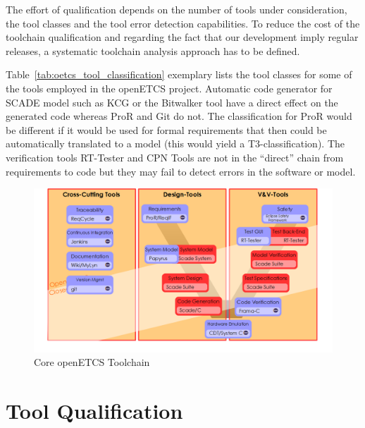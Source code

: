 \documentclass{template/openetcs_report}
\begin{document}
The effort of qualification depends on the number of tools under
consideration, the tool classes and the tool error detection
capabilities. To reduce the cost of the toolchain qualification and
regarding the fact that our development imply regular releases, a
systematic toolchain analysis approach has to be defined.

Table~\ref{tab:oetcs_tool_classification} exemplary lists the tool
classes for some of the tools employed in the openETCS
project. Automatic code generator for SCADE model such as KCG or the
Bitwalker tool have a direct effect on the generated code whereas ProR
and Git do not. The classification for ProR would be different if it
would be used for formal requirements that then could be automatically
translated to a model (this would yield a T3-classification). The
verification tools RT-Tester and CPN Tools are not in the ``direct''
chain from requirements to code but they may fail to detect errors in
the software or model.

\begin{figure}[h]
\centering
\includegraphics[width=0.9\linewidth]{./images/Toolchain-New-Version-V-Model-Nov-2015}
\caption{Core openETCS Toolchain}
\label{fig:Toolchain-New}
\end{figure}


\section{Tool Qualification}
\end{document}
